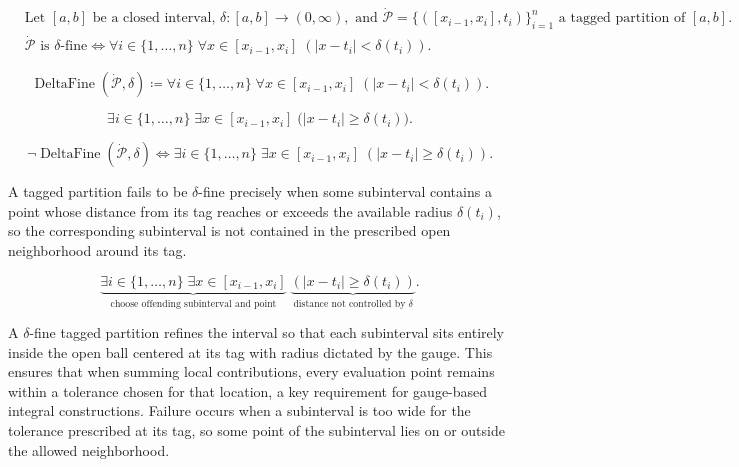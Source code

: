 \begin{remark*}
\[
\begin{aligned}
&\text{Let } [a,b] \text{ be a closed interval, } \delta:[a,b]\to(0,\infty), \text{ and } \dot{\mathcal{P}}=\{([x_{i-1},x_i],t_i)\}_{i=1}^n \text{ a tagged partition of } [a,b].\\
&\dot{\mathcal{P}} \text{ is }\delta\text{-fine} \Longleftrightarrow \forall i \in \{1,\dots,n\}\;\forall x \in [x_{i-1},x_i]\;( |x-t_i|<\delta(t_i)).
\end{aligned}
\]
\end{remark*}

\begin{remark*}
\[
\operatorname{DeltaFine}(\dot{\mathcal{P}},\delta) \coloneqq \forall i \in \{1,\dots,n\}\;\forall x \in [x_{i-1},x_i]\;( |x-t_i|<\delta(t_i)).
\]
\end{remark*}

\begin{remark*}
\[
\exists i \in \{1,\dots,n\}\;\exists x \in [x_{i-1},x_i]\;
\bigl(|x-t_i|\ge \delta(t_i)\bigr).
\]
\end{remark*}

\begin{remark*}
\[
\neg \operatorname{DeltaFine}(\dot{\mathcal{P}},\delta) \Longleftrightarrow \exists i \in \{1,\dots,n\}\;\exists x \in [x_{i-1},x_i]\;( |x-t_i|\ge \delta(t_i)).
\]
\end{remark*}

\begin{remark*}
A tagged partition fails to be $\delta$-fine precisely when some subinterval contains a point whose distance from its tag reaches or exceeds the available radius $\delta(t_i)$, so the corresponding subinterval is not contained in the prescribed open neighborhood around its tag.
\end{remark*}

\begin{remark*}
\[
\underbrace{\exists i \in \{1,\dots,n\}\;\exists x \in [x_{i-1},x_i]}_{\text{choose offending subinterval and point}}
\;\underbrace{(|x-t_i|\ge \delta(t_i))}_{\text{distance not controlled by }\delta}.
\]
\end{remark*}

\begin{remark*}[Interpretation]
A $\delta$-fine tagged partition refines the interval so that each subinterval sits entirely inside the open ball centered at its tag with radius dictated by the gauge. This ensures that when summing local contributions, every evaluation point remains within a tolerance chosen for that location, a key requirement for gauge-based integral constructions. Failure occurs when a subinterval is too wide for the tolerance prescribed at its tag, so some point of the subinterval lies on or outside the allowed neighborhood.
\end{remark*}

